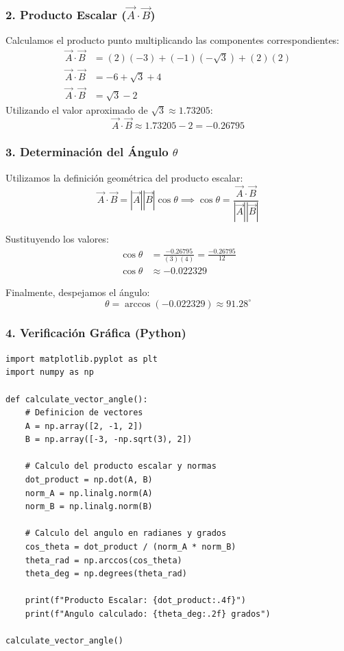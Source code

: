 \documentclass[12pt, a4paper]{article}
\begin{document}
\subsubsection*{2. Producto Escalar ($\vec{A} \cdot \vec{B}$)}
Calculamos el producto punto multiplicando las componentes correspondientes:
\begin{align*}
    \vec{A} \cdot \vec{B} &= (2)(-3) + (-1)(-\sqrt{3}) + (2)(2) \\
    \vec{A} \cdot \vec{B} &= -6 + \sqrt{3} + 4 \\
    \vec{A} \cdot \vec{B} &= \sqrt{3} - 2
\end{align*}
Utilizando el valor aproximado de $\sqrt{3} \approx 1.73205$:
\begin{equation*}
    \vec{A} \cdot \vec{B} \approx 1.73205 - 2 = -0.26795
\end{equation*}

\subsubsection*{3. Determinación del Ángulo $\theta$}
Utilizamos la definición geométrica del producto escalar:
\begin{equation*}
    \vec{A} \cdot \vec{B} = |\vec{A}| |\vec{B}| \cos \theta \implies \cos \theta = \frac{\vec{A} \cdot \vec{B}}{|\vec{A}| |\vec{B}|}
\end{equation*}

Sustituyendo los valores:
\begin{align*}
    \cos \theta &= \frac{-0.26795}{(3)(4)} = \frac{-0.26795}{12} \\
    \cos \theta &\approx -0.022329
\end{align*}

Finalmente, despejamos el ángulo:
\begin{equation*}
    \theta = \arccos(-0.022329) \approx 91.28^\circ
\end{equation*}

\subsubsection*{4. Verificación Gráfica (Python)}
\begin{lstlisting}
import matplotlib.pyplot as plt
import numpy as np

def calculate_vector_angle():
    # Definicion de vectores
    A = np.array([2, -1, 2])
    B = np.array([-3, -np.sqrt(3), 2])
    
    # Calculo del producto escalar y normas
    dot_product = np.dot(A, B)
    norm_A = np.linalg.norm(A)
    norm_B = np.linalg.norm(B)
    
    # Calculo del angulo en radianes y grados
    cos_theta = dot_product / (norm_A * norm_B)
    theta_rad = np.arccos(cos_theta)
    theta_deg = np.degrees(theta_rad)
    
    print(f"Producto Escalar: {dot_product:.4f}")
    print(f"Angulo calculado: {theta_deg:.2f} grados")

calculate_vector_angle()
\end{lstlisting}
\end{document}
